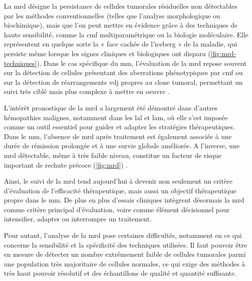 \vspace{1em}

La \gls{mrd} désigne la persistance de cellules tumorales résiduelles non détectables 
par les méthodes conventionnelles (telles que l'analyse morphologique ou biochimique), mais que l'on peut mettre en évidence 
grâce à des techniques de haute sensibilité, comme la \gls{cmf} multiparamétrique ou la biologie moléculaire. Elle représentent 
en quelque sorte la « face cachée de l'iceberg » de la maladie, qui persiste même lorsque les signes cliniques et biologiques 
ont disparu (\autoref{fig:mrd-techniques}).
Dans le cas spécifique du \gls{mm}, l'évaluation de la \gls{mrd} repose souvent sur la détection de cellules présentant des 
aberrations phénotypiques par \gls{cmf} ou sur la détection de réarrangements \gls{vdj} propres au clone tumoral, permettant un suivi très ciblé 
mais plus complexe à mettre en oeuvre \cite{bertaminiMRDAssessmentMultiple2021}.



L'intérêt pronostique de la \gls{mrd} a largement été démontré dans d'autres hémopathies malignes, notamment dans les \gls{lal} et \gls{lam}, 
où elle s'est imposée comme un outil essentiel pour guider et adapter les stratégies thérapeutiques. Dans le \gls{mm}, l'absence de \gls{mrd} 
après traitement est également associée à une durée de rémission prolongée et à une survie globale améliorée. A l'inverse, une \gls{mrd} détectable, 
même à très faible niveau, constitue un facteur de risque important de rechute précoce (\autoref{fig:mrd})
\cite{munshiLargeMetaanalysisEstablishes2020}.

\vspace{1em}

Ainsi, le suivi de la \gls{mrd} tend aujourd'hui à devenir non seulement un critère d'évaluation de l'efficacité thérapeutique, mais aussi un objectif 
thérapeutique propre dans le \gls{mm}. De plus en plus d'essais cliniques intègrent désormais la \gls{mrd} comme critère principal d'évaluation, 
voire comme élément décisionnel pour intensifier, adapter ou interrompre un traitement.



Pour autant, l'analyse de la \gls{mrd} pose certaines difficultés, notamment en ce qui concerne la sensibilité et la spécificité des techniques utilisées.
Il faut pouvoir être en mesure de détecter un nombre extrêmement faible de cellules tumorales parmi une population très majoritaire de cellules normales,
ce qui exige des méthodes à très haut pouvoir résolutif et des échantillons de qualité et quantité suffisante.

